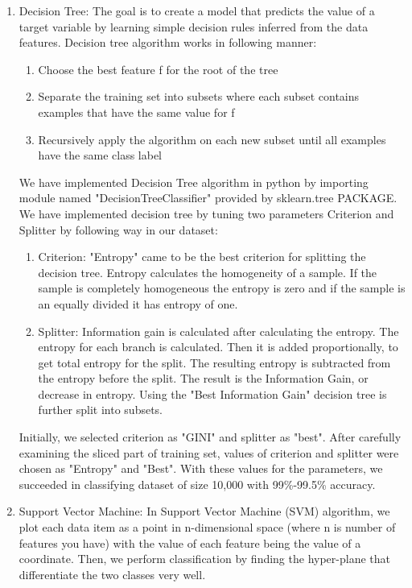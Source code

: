 \documentclass{acm_proc_article-sp}
\begin{document}
\begin{enumerate}
\item Decision Tree:
The goal is to create a model that predicts the value of a target variable by learning simple decision rules inferred from the data features.
Decision tree algorithm works in following manner:
\begin{enumerate}
\item Choose the best feature f for the root of the tree
\item Separate the training set into subsets where each subset contains examples that have the same value for f
\item Recursively apply the algorithm on each new subset until all examples have the same class label
\end{enumerate}

We have implemented Decision Tree algorithm in python by importing module named "DecisionTreeClassifier" provided by sklearn.tree PACKAGE. We have implemented decision tree by tuning two parameters Criterion and Splitter by following way in our dataset:
\begin{enumerate}
\item Criterion: "Entropy" came to be the best criterion for splitting the decision tree. Entropy calculates the homogeneity of a sample. If the sample is completely homogeneous the entropy is zero and if the sample is an equally divided it has entropy of one.
\item Splitter: Information gain is calculated after calculating the entropy. The entropy for each branch is calculated. Then it is added proportionally, to get total entropy for the split. The resulting entropy is subtracted from the entropy before the split. The result is the Information Gain, or decrease in entropy. Using the "Best Information Gain" decision tree is further split into subsets.
\end{enumerate}
Initially, we selected criterion as "GINI" and splitter as "best". After carefully examining the sliced part of training set, values of criterion and splitter were chosen as "Entropy" and "Best". With these values for the parameters, we succeeded in classifying dataset of size 10,000 with 99\%-99.5\% accuracy.

\item Support Vector Machine:
In Support Vector Machine (SVM) algorithm, we plot each data item as a point in n-dimensional space (where n is number of features you have) with the value of each feature being the value of a coordinate. Then, we perform classification by finding the hyper-plane that differentiate the two classes very well.


\end{enumerate}
\end{document}
